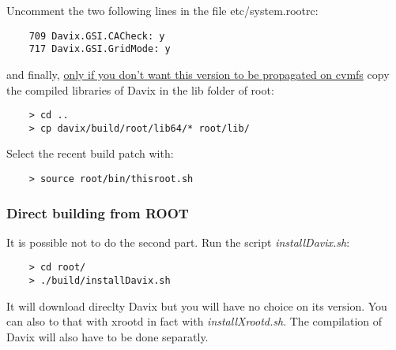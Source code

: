 Uncomment the two following lines in the file etc/system.rootrc:

\begin{lstlisting}
	709 Davix.GSI.CACheck: y
	717 Davix.GSI.GridMode: y
\end{lstlisting}

and finally, \underline{only if you don't want this version to be propagated on cvmfs} copy the compiled libraries of Davix in the lib folder of root:

\begin{lstlisting}
	> cd ..
	> cp davix/build/root/lib64/* root/lib/
\end{lstlisting}

Select the recent build patch with:

\begin{lstlisting}
	> source root/bin/thisroot.sh
\end{lstlisting}


\subsubsection{Direct building from ROOT}

It is possible not to do the second part. Run the script \textit{installDavix.sh}:

\begin{lstlisting}
	> cd root/
	> ./build/installDavix.sh
\end{lstlisting}

It will download direclty Davix but you will have no choice on its version. You can also to that with xrootd in fact with \textit{installXrootd.sh}. The compilation of Davix will also have to be done separatly.

